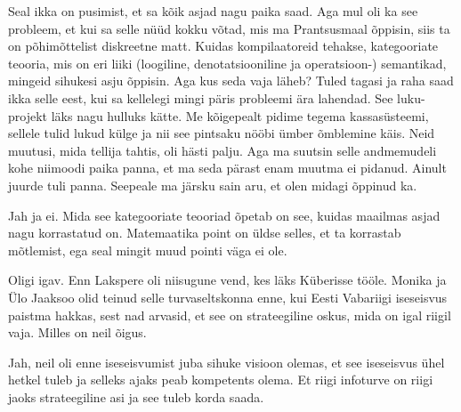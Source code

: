                  
Seal ikka on pusimist, et sa kõik asjad nagu paika saad. Aga mul oli ka see 
probleem, et kui sa selle nüüd kokku võtad, mis ma  Prantsusmaal õppisin, siis 
ta on põhimõttelist diskreetne matt. Kuidas  kompilaatoreid tehakse, 
kategooriate teooria, mis on eri liiki (loogiline, denotatsiooniline ja 
operatsioon-) semantikad, mingeid sihukesi asju õppisin. Aga kus seda vaja 
läheb? Tuled tagasi ja raha saad ikka selle eest, kui sa kellelegi mingi päris 
probleemi ära lahendad. See luku-projekt läks nagu hulluks kätte. Me kõigepealt 
pidime tegema kassasüsteemi, sellele tulid lukud külge ja nii see pintsaku 
nööbi ümber õmblemine käis. Neid muutusi, mida tellija tahtis, oli  hästi 
palju. Aga ma suutsin  selle andmemudeli kohe niimoodi paika panna, et ma seda 
pärast enam muutma ei pidanud. Ainult juurde tuli panna. Seepeale ma järsku sain 
aru, et olen midagi õppinud ka.


Jah ja ei. Mida  see kategooriate teooriad õpetab on see, kuidas  maailmas 
asjad nagu korrastatud on. Matemaatika point on üldse selles, et ta korrastab 
mõtlemist, ega seal mingit muud pointi väga ei ole.
                 

Oligi igav. Enn Lakspere oli niisugune vend, kes  
läks Küberisse tööle. Monika ja Ülo Jaaksoo olid 
teinud selle turvaseltskonna enne, kui Eesti Vabariigi iseseisvus paistma 
hakkas, sest nad arvasid, et see on strateegiline oskus, mida on igal riigil 
vaja. Milles on neil õigus.
                 
                 
Jah, neil oli enne iseseisvumist juba sihuke visioon olemas, et see iseseisvus 
ühel hetkel tuleb ja selleks ajaks peab kompetents olema. Et riigi  
infoturve on riigi jaoks strateegiline asi ja see tuleb korda saada.


